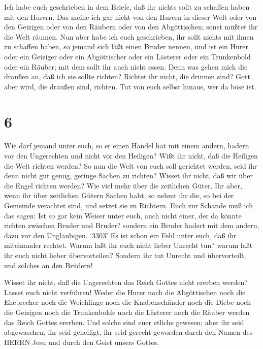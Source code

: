  Ich habe euch geschrieben in dem Briefe, daß ihr nichts
sollt zu schaffen haben mit den Hurern.  Das meine ich gar
nicht von den Hurern in dieser Welt oder von den Geizigen oder von den
Räubern oder von den Abgöttischen; sonst müßtet ihr die Welt räumen.
 Nun aber habe ich euch geschrieben, ihr sollt nichts mit
ihnen zu schaffen haben, so jemand sich läßt einen Bruder nennen, und
ist ein Hurer oder ein Geiziger oder ein Abgöttischer oder ein Lästerer
oder ein Trunkenbold oder ein Räuber; mit dem sollt ihr auch nicht
essen.  Denn was gehen mich die draußen an, daß ich sie
sollte richten? Richtet ihr nicht, die drinnen sind?  Gott
aber wird, die draußen sind, richten. Tut von euch selbst hinaus, wer da
böse ist.

\hypertarget{section-5}{%
\section{6}\label{section-5}}

 Wie darf jemand unter euch, so er einen Handel hat mit
einem andern, hadern vor den Ungerechten und nicht vor den Heiligen?
 Wißt ihr nicht, daß die Heiligen die Welt richten werden?
So nun die Welt von euch soll gerichtet werden, seid ihr denn nicht gut
genug, geringe Sachen zu richten?  Wisset ihr nicht, daß wir
über die Engel richten werden? Wie viel mehr über die zeitlichen Güter.
 Ihr aber, wenn ihr über zeitlichen Gütern Sachen habt, so
nehmt ihr die, so bei der Gemeinde verachtet sind, und setzet sie zu
Richtern.  Euch zur Schande muß ich das sagen: Ist so gar
kein Weiser unter euch, auch nicht einer, der da könnte richten zwischen
Bruder und Bruder?  sondern ein Bruder hadert mit dem
andern, dazu vor den Ungläubigen.  `3303' Es ist schon ein
Fehl unter euch, daß ihr miteinander rechtet. Warum laßt ihr euch nicht
lieber Unrecht tun? warum laßt ihr euch nicht lieber übervorteilen?
 Sondern ihr tut Unrecht und übervorteilt, und solches an
den Brüdern!

 Wisset ihr nicht, daß die Ungerechten das Reich Gottes
nicht ererben werden? Lasset euch nicht verführen! Weder die Hurer noch
die Abgöttischen noch die Ehebrecher noch die Weichlinge noch die
Knabenschänder  noch die Diebe noch die Geizigen noch die
Trunkenbolde noch die Lästerer noch die Räuber werden das Reich Gottes
ererben.  Und solche sind euer etliche gewesen; aber ihr
seid abgewaschen, ihr seid geheiligt, ihr seid gerecht geworden durch
den Namen des HERRN Jesu und durch den Geist unsers Gottes.

